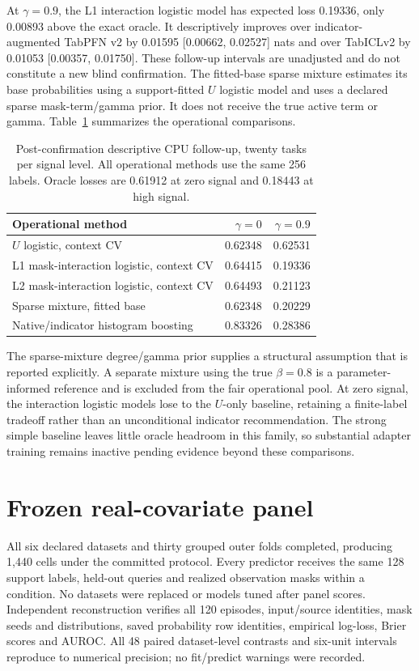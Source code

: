 \documentclass[10pt]{article}
\begin{document}
At $\gamma=0.9$, the L1 interaction logistic model has expected loss 0.19336, only 0.00893 above the exact oracle. It descriptively improves over indicator-augmented TabPFN v2 by 0.01595 [0.00662, 0.02527] nats and over TabICLv2 by 0.01053 [0.00357, 0.01750]. These follow-up intervals are unadjusted and do not constitute a new blind confirmation. The fitted-base sparse mixture estimates its base probabilities using a support-fitted $U$ logistic model and uses a declared sparse mask-term/gamma prior. It does not receive the true active term or gamma. Table~\ref{tab:strong} summarizes the operational comparisons.

\begin{table}[t]
\centering\small
\caption{Post-confirmation descriptive CPU follow-up, twenty tasks per signal level. All operational methods use the same 256 labels. Oracle losses are 0.61912 at zero signal and 0.18443 at high signal.}
\label{tab:strong}
\begin{tabular}{@{}lrr@{}}\toprule
Operational method & $\gamma=0$ & $\gamma=0.9$\\\midrule
$U$ logistic, context CV & 0.62348 & 0.62531\\
L1 mask-interaction logistic, context CV & 0.64415 & 0.19336\\
L2 mask-interaction logistic, context CV & 0.64493 & 0.21123\\
Sparse mixture, fitted base & 0.62348 & 0.20229\\
Native/indicator histogram boosting & 0.83326 & 0.28386\\\bottomrule
\end{tabular}
\end{table}

The sparse-mixture degree/gamma prior supplies a structural assumption that is reported explicitly. A separate mixture using the true $\beta=0.8$ is a parameter-informed reference and is excluded from the fair operational pool. At zero signal, the interaction logistic models lose to the $U$-only baseline, retaining a finite-label tradeoff rather than an unconditional indicator recommendation. The strong simple baseline leaves little oracle headroom in this family, so substantial adapter training remains inactive pending evidence beyond these comparisons.

\section{Frozen real-covariate panel}
All six declared datasets and thirty grouped outer folds completed, producing 1,440 cells under the committed protocol. Every predictor receives the same 128 support labels, held-out queries and realized observation masks within a condition. No datasets were replaced or models tuned after panel scores. Independent reconstruction verifies all 120 episodes, input/source identities, mask seeds and distributions, saved probability row identities, empirical log-loss, Brier scores and AUROC. All 48 paired dataset-level contrasts and six-unit intervals reproduce to numerical precision; no fit/predict warnings were recorded.
\end{document}
